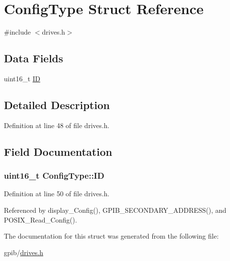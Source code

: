 \hypertarget{structConfigType}{}\section{Config\+Type Struct Reference}
\label{structConfigType}


{\ttfamily \#include $<$drives.\+h$>$}

\subsection*{Data Fields}
\begin{DoxyCompactItemize}
\item 
uint16\+\_\+t \hyperlink{structConfigType_a7d89346361dc0f06db0917c7ff37501a}{ID}
\end{DoxyCompactItemize}


\subsection{Detailed Description}


Definition at line 48 of file drives.\+h.



\subsection{Field Documentation}
\subsubsection[{\texorpdfstring{ID}{ID}}]{\setlength{\rightskip}{0pt plus 5cm}uint16\+\_\+t Config\+Type\+::\+ID}\hypertarget{structConfigType_a7d89346361dc0f06db0917c7ff37501a}{}\label{structConfigType_a7d89346361dc0f06db0917c7ff37501a}


Definition at line 50 of file drives.\+h.



Referenced by display\+\_\+\+Config(), G\+P\+I\+B\+\_\+\+S\+E\+C\+O\+N\+D\+A\+R\+Y\+\_\+\+A\+D\+D\+R\+E\+S\+S(), and P\+O\+S\+I\+X\+\_\+\+Read\+\_\+\+Config().



The documentation for this struct was generated from the following file\+:\begin{DoxyCompactItemize}
\item 
gpib/\hyperlink{drives_8h}{drives.\+h}\end{DoxyCompactItemize}
